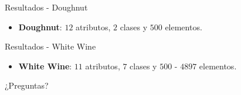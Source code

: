 \documentclass[10pt]{beamer}
\begin{document}
\begin{frame}{Resultados - Doughnut}
\begin{itemize}
\item \textbf{Doughnut}: $12$ atributos, $2$ clases y $500$ elementos.
\end{itemize}
\begin{figure}[htbp]
\centering
{}
\end{figure}
\end{frame}

\begin{frame}{Resultados - White Wine}
\begin{itemize}
\item \textbf{White Wine}: $11$ atributos, $7$ clases y $500$ - $4897$ elementos.
\end{itemize}
\begin{figure}[htbp]
\centering
{}
\end{figure}
\end{frame}


\begin{frame}[standout]
	¿Preguntas?
\end{frame}
\end{document}
